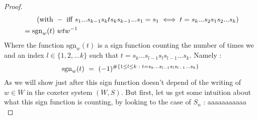 \begin{proof}
\begin{equation}
\begin{split}
		& \quad\quad (\mbox{with }-\mbox{ iff }s_1...s_{k-1}s_kts_ks_{k-1}...s_1=s_{1}\iff t=s_k...s_2s_1s_2...s_k)\\
		&=\mbox{sgn}_w(t)\text{ } wtw^{-1}
		\end{split}
		\end{equation}
		Where the function $\mbox{sgn}_w(t)$ is a sign function counting the number of times we and an index $l\in \{1,2,...k\}$ such that $t=s_k...s_{l-1}s_l s_{l-1}...s_k$. Namely :
		\begin{equation}
		 \mbox{sgn}_w(t)\text{ }=\text{ } (-1)^{\# \{1\leq l\leq k\text{ } :\text{ } t=s_k...s_{l-1}s_l s_{l-1}...s_k\}}
		\end{equation}
		As we will show just after this sign function doesn't depend of the writing of $w\in W$ in the coxeter system $(W,S)$. But first, let us get some intuition about what this sign function is counting, by looking to the case of $S_n$ : aaaaaaaaaaa\\
		

\end{proof}
